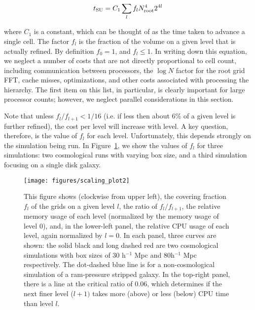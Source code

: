 \begin{equation} 
t_{\rm SU} = C_1 \sum_l f_l N_{\rm root}^4 2^{4l}
\end{equation} 

where $C_1$ is a constant, which can be thought of as the time taken
to advance a single cell.  The factor $f_l$ is the fraction of the
volume on a given level that is actually refined.  By definition $f_0
= 1$, and $f_l \le 1$.  In writing down this equation, we neglect a
number of costs that are not directly proportional to cell count,
including communication between processors, the $\log{N}$ factor for
the root grid FFT, cache misses, optimizations, and other costs
associated with processing the hierarchy.  The first item on this
list, in particular, is clearly important for large processor counts;
however, we neglect parallel considerations in this section.

Note that unless $f_l/f_{l+1} < 1/16$ (i.e. if less then about 6\% of
a given level is further refined), the cost per level will increase
with level.  A key question, therefore, is the value of $f_l$ for each
level.  Unfortunately, this depends strongly on the simulation being
run.  In Figure~\ref{fig:scaling}, we show the values of $f_l$ for
three simulations: two cosmological runs with varying box size, and a
third simulation focusing on a single disk galaxy.

\begin{figure}
\centerline{\texttt{[image: figures/scaling\_plot2]}}
\caption{This figure shows (clockwise from upper left), the covering
fraction $f_l$ of the grids on a given level $l$, the ratio of
$f_{l}/f_{l+1}$, the relative memory usage of each level (normalized
by the memory usage of level 0), and, in the lower-left panel, the
relative CPU usage of each level, again normalized by $l=0$.  In each
panel, three curves are shown: the solid black and long dashed red are
two cosmological simulations with box sizes of 30 h$^{-1}$ Mpc and
80h$^{-1}$ Mpc respectively.  The dot-dashed blue line is for a
non-cosmological simulation of a ram-pressure stripped galaxy.  In the
top-right panel, there is a line at the critical ratio of 0.06, which
determines if the next finer level ($l+1)$ takes more (above) or less
(below) CPU time than level $l$.}
\label{fig:scaling}
\end{figure}

